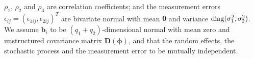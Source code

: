 \documentclass[article,lineno]{biometrika}
\begin{document}
$\rho_1$,  $\rho_2$ and $\rho_3$ 
are correlation coefficients; 
and 
the measurement errors $\epsilon_{ij} = (\epsilon_{1ij}, \epsilon_{2ij})^T$ are bivariate  normal with mean $\bm 0$ and variance ${\rm diag}(\sigma_1^2, \sigma_2^2)$.
We assume  $\bm b_i$ to be  $(q_1 + q_2)$-dimensional normal  with mean zero and unstructured covariance matrix $\bm D(\bm \phi)$,   
and that the random effects, the stochastic process and the measurement error to be mutually independent. 
\end{document}
